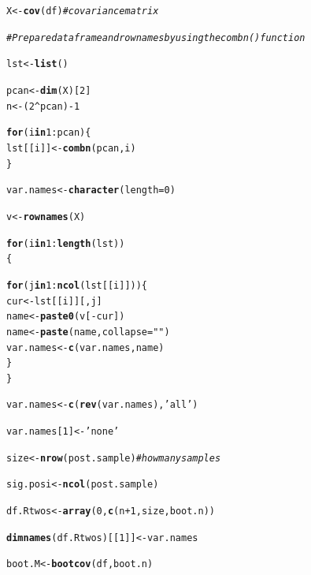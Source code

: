 \documentclass[11pt,a4paper,twoside]{book}\usepackage[]{graphicx}\usepackage[]{color}
\makeatletter
\newcommand{\hlnum}[1]{\textcolor[rgb]{0.686,0.059,0.569}{#1}}%
\newcommand{\hlstr}[1]{\textcolor[rgb]{0.192,0.494,0.8}{#1}}%
\newcommand{\hlcom}[1]{\textcolor[rgb]{0.678,0.584,0.686}{\textit{#1}}}%
\newcommand{\hlopt}[1]{\textcolor[rgb]{0,0,0}{#1}}%
\newcommand{\hlstd}[1]{\textcolor[rgb]{0.345,0.345,0.345}{#1}}%
\newcommand{\hlkwa}[1]{\textcolor[rgb]{0.161,0.373,0.58}{\textbf{#1}}}%
\newcommand{\hlkwb}[1]{\textcolor[rgb]{0.69,0.353,0.396}{#1}}%
\newcommand{\hlkwc}[1]{\textcolor[rgb]{0.333,0.667,0.333}{#1}}%
\newcommand{\hlkwd}[1]{\textcolor[rgb]{0.737,0.353,0.396}{\textbf{#1}}}%
\newenvironment{kframe}{%
 \def\at@end@of@kframe{}%
 \ifinner\ifhmode%
  \def\at@end@of@kframe{\end{minipage}}%
  \begin{minipage}{\columnwidth}%
 \fi\fi%
 \def\FrameCommand##1{\hskip\@totalleftmargin \hskip-\fboxsep
 \colorbox{shadecolor}{##1}\hskip-\fboxsep
     \hskip-\linewidth \hskip-\@totalleftmargin \hskip\columnwidth}%
 \MakeFramed {\advance\hsize-\width
   \@totalleftmargin\z@ \linewidth\hsize
   \@setminipage}}%
 {\par\unskip\endMakeFramed%
 \at@end@of@kframe}
\newenvironment{knitrout}{}{} %
\makeatother
\begin{document}
\begin{knitrout}
\begin{kframe}
\begin{alltt}
        \hlstd{X} \hlkwb{<-} \hlkwd{cov}\hlstd{(df)} \hlcom{#covariance matrix}

        \hlcom{#Prepare data frame and rownames by using the combn() function}

        \hlstd{lst} \hlkwb{<-} \hlkwd{list}\hlstd{()}

        \hlstd{pcan} \hlkwb{<-} \hlkwd{dim}\hlstd{(X)[}\hlnum{2}\hlstd{]}
        \hlstd{n} \hlkwb{<-} \hlstd{(}\hlnum{2}\hlopt{^}\hlstd{pcan)}\hlopt{-}\hlnum{1}

        \hlkwa{for} \hlstd{(i} \hlkwa{in} \hlnum{1}\hlopt{:}\hlstd{pcan)\{}
                \hlstd{lst[[i]]} \hlkwb{<-} \hlkwd{combn}\hlstd{(pcan,i)}
        \hlstd{\}}

        \hlstd{var.names} \hlkwb{<-} \hlkwd{character}\hlstd{(}\hlkwc{length} \hlstd{=} \hlnum{0}\hlstd{)}

        \hlstd{v}\hlkwb{<-} \hlkwd{rownames}\hlstd{(X)}

        \hlkwa{for}\hlstd{(i} \hlkwa{in} \hlnum{1}\hlopt{:}\hlkwd{length}\hlstd{(lst))}
        \hlstd{\{}

                \hlkwa{for} \hlstd{(j} \hlkwa{in} \hlnum{1}\hlopt{:}\hlkwd{ncol}\hlstd{(lst[[i]]))\{}
                        \hlstd{cur}\hlkwb{<-} \hlstd{lst[[i]][,j]}
                        \hlstd{name} \hlkwb{<-} \hlkwd{paste0}\hlstd{(v[}\hlopt{-}\hlstd{cur])}
                        \hlstd{name} \hlkwb{<-} \hlkwd{paste}\hlstd{(name,} \hlkwc{collapse} \hlstd{=} \hlstr{" "}\hlstd{)}
                        \hlstd{var.names} \hlkwb{<-} \hlkwd{c}\hlstd{(var.names, name)}
                \hlstd{\}}
        \hlstd{\}}

        \hlstd{var.names}\hlkwb{<-}\hlkwd{c}\hlstd{(}\hlkwd{rev}\hlstd{(var.names),} \hlstr{'all'}\hlstd{)}

        \hlstd{var.names[}\hlnum{1}\hlstd{]}\hlkwb{<-}\hlstr{'none'}

        \hlstd{size} \hlkwb{<-} \hlkwd{nrow}\hlstd{(post.sample)}  \hlcom{# how many samples}

        \hlstd{sig.posi} \hlkwb{<-} \hlkwd{ncol}\hlstd{(post.sample)}

        \hlstd{df.Rtwos}\hlkwb{<-}\hlkwd{array}\hlstd{(}\hlnum{0}\hlstd{,}\hlkwd{c}\hlstd{(n}\hlopt{+}\hlnum{1}\hlstd{,size, boot.n))}

        \hlkwd{dimnames}\hlstd{(df.Rtwos)[[}\hlnum{1}\hlstd{]]} \hlkwb{<-} \hlstd{var.names}

        \hlstd{boot.M} \hlkwb{<-} \hlkwd{bootcov}\hlstd{(df, boot.n)}


\end{alltt}
\end{kframe}
\end{knitrout}
\end{document}
